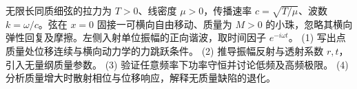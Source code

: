 无限长同质细弦的拉力为 \(T>0\)、线密度 \(\mu>0\)，传播速率 \(c=\sqrt{T/\mu}\)、波数 \(k=\omega/c\)。弦在 \(x=0\) 固接一可横向自由移动、质量为 \(M>0\) 的小珠，忽略其横向弹性回复及摩擦。左侧入射单位振幅的正向谐波，取时间因子 \(e^{-i\omega t}\)。
(1) 写出点质量处位移连续与横向动力学的力跳跃条件。
(2) 推导振幅反射与透射系数 \(r,t\)，引入无量纲质量参数。
(3) 验证任意频率下功率守恒并讨论低频及高频极限。
(4) 分析质量增大时散射相位与位移响应，解释无质量缺陷的退化。
